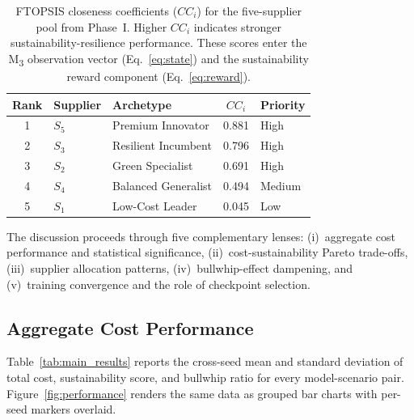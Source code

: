 \documentclass[preprint,12pt]{elsarticle}
\begin{document}
\begin{table}[htbp]
\centering
\caption{FTOPSIS closeness coefficients ($CC_i$) for the five-supplier pool from Phase~I.
Higher $CC_i$ indicates stronger sustainability-resilience performance.
These scores enter the M\textsubscript{3} observation vector (Eq.~\ref{eq:state}) and the sustainability reward component (Eq.~\ref{eq:reward}).}
\label{tab:ftopsis_scores}
\small
\begin{tabular}{@{}c l l c l@{}}
\toprule
Rank & Supplier & Archetype & $CC_i$ & Priority \\
\midrule
1 & $S_5$ & Premium Innovator     & 0.881 & High \\
2 & $S_3$ & Resilient Incumbent   & 0.796 & High \\
3 & $S_2$ & Green Specialist      & 0.691 & High \\
4 & $S_4$ & Balanced Generalist   & 0.494 & Medium \\
5 & $S_1$ & Low-Cost Leader       & 0.045 & Low \\
\bottomrule
\end{tabular}
\end{table}

The discussion proceeds through five complementary lenses: (i)~aggregate cost performance and statistical significance, (ii)~cost-sustainability Pareto trade-offs, (iii)~supplier allocation patterns, (iv)~bullwhip-effect dampening, and (v)~training convergence and the role of checkpoint selection.

\subsection{Aggregate Cost Performance}
\label{sec:cost_results}

Table~\ref{tab:main_results} reports the cross-seed mean and standard deviation of total cost, sustainability score, and bullwhip ratio for every model-scenario pair.
Figure~\ref{fig:performance} renders the same data as grouped bar charts with per-seed markers overlaid.
\end{document}
